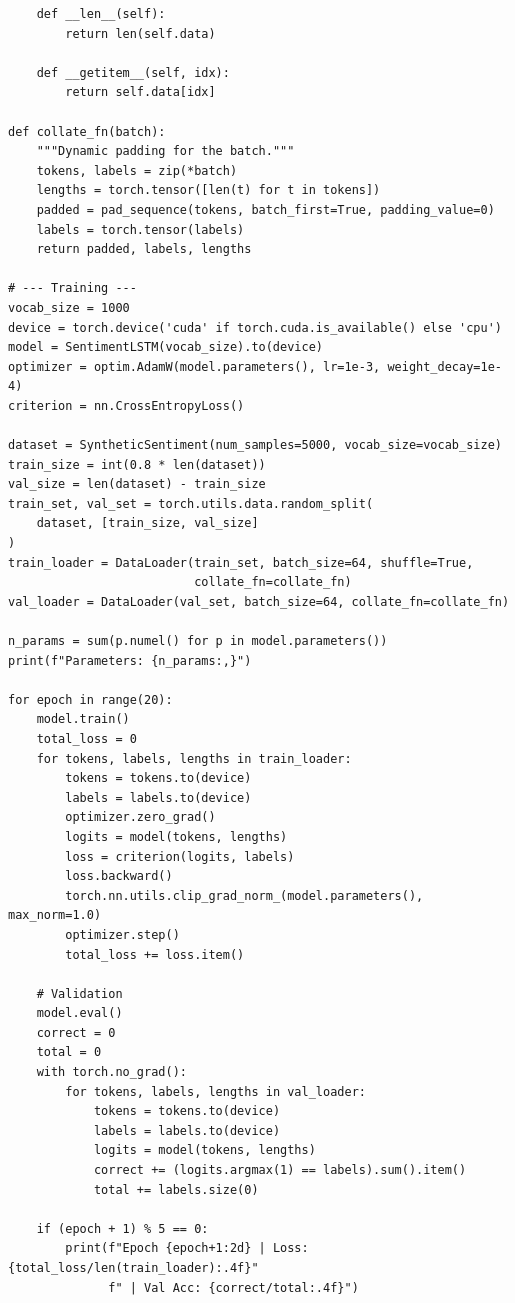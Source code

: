 \begin{codeblock}[title=\textbf{Sequence classification with bidirectional LSTM}]
\begin{verbatim}
    def __len__(self):
        return len(self.data)

    def __getitem__(self, idx):
        return self.data[idx]

def collate_fn(batch):
    """Dynamic padding for the batch."""
    tokens, labels = zip(*batch)
    lengths = torch.tensor([len(t) for t in tokens])
    padded = pad_sequence(tokens, batch_first=True, padding_value=0)
    labels = torch.tensor(labels)
    return padded, labels, lengths

# --- Training ---
vocab_size = 1000
device = torch.device('cuda' if torch.cuda.is_available() else 'cpu')
model = SentimentLSTM(vocab_size).to(device)
optimizer = optim.AdamW(model.parameters(), lr=1e-3, weight_decay=1e-4)
criterion = nn.CrossEntropyLoss()

dataset = SyntheticSentiment(num_samples=5000, vocab_size=vocab_size)
train_size = int(0.8 * len(dataset))
val_size = len(dataset) - train_size
train_set, val_set = torch.utils.data.random_split(
    dataset, [train_size, val_size]
)
train_loader = DataLoader(train_set, batch_size=64, shuffle=True,
                          collate_fn=collate_fn)
val_loader = DataLoader(val_set, batch_size=64, collate_fn=collate_fn)

n_params = sum(p.numel() for p in model.parameters())
print(f"Parameters: {n_params:,}")

for epoch in range(20):
    model.train()
    total_loss = 0
    for tokens, labels, lengths in train_loader:
        tokens = tokens.to(device)
        labels = labels.to(device)
        optimizer.zero_grad()
        logits = model(tokens, lengths)
        loss = criterion(logits, labels)
        loss.backward()
        torch.nn.utils.clip_grad_norm_(model.parameters(), max_norm=1.0)
        optimizer.step()
        total_loss += loss.item()

    # Validation
    model.eval()
    correct = 0
    total = 0
    with torch.no_grad():
        for tokens, labels, lengths in val_loader:
            tokens = tokens.to(device)
            labels = labels.to(device)
            logits = model(tokens, lengths)
            correct += (logits.argmax(1) == labels).sum().item()
            total += labels.size(0)

    if (epoch + 1) % 5 == 0:
        print(f"Epoch {epoch+1:2d} | Loss: {total_loss/len(train_loader):.4f}"
              f" | Val Acc: {correct/total:.4f}")
\end{verbatim}
\end{codeblock}

